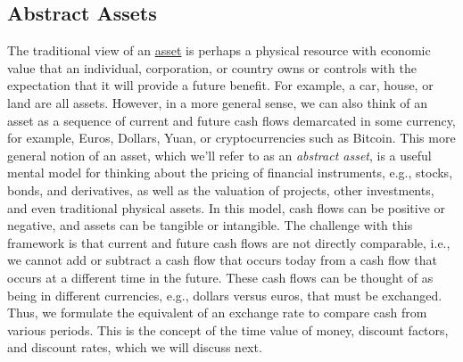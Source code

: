 \documentclass[11pt]{article}
\theoremstyle{definition}
\newcommand{\newterm}[1]{{\it #1}}
\begin{document}
\subsection{Abstract Assets}
The traditional view of an \href{https://en.wikipedia.org/wiki/Asset}{asset} is perhaps a physical resource with economic value that an individual, corporation, or country owns or controls with the expectation that it will provide a future benefit.
For example, a car, house, or land are all assets.
However, in a more general sense, we can also think of an asset as a sequence of current and future cash flows demarcated in some currency, for example, Euros, Dollars, Yuan, or cryptocurrencies such as Bitcoin.
This more general notion of an asset, which we'll refer to as an \newterm{abstract asset}, is a useful mental model for thinking about the pricing of financial instruments, e.g., stocks, bonds, and derivatives, 
as well as the valuation of projects, other investments, and even traditional physical assets.
In this model, cash flows can be positive or negative, and assets can be tangible or intangible.
The challenge with this framework is that current and future cash flows are not directly comparable,
i.e., we cannot add or subtract a cash flow that occurs today from a cash flow that occurs at a different time in the future.
These cash flows can be thought of as being in different currencies, e.g., dollars versus euros, that must be exchanged. Thus, we formulate the equivalent of an exchange rate to compare cash from various periods.
This is the concept of the time value of money, discount factors, and discount rates, which we will discuss next.
\end{document}
